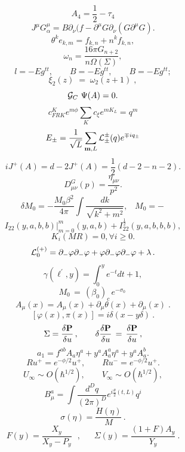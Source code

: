 \documentclass{article}
\begin{document}
$$A _ { 4 } = \frac { 1 } { 2 } - \tau _ { 4 }$$
$$J ^ { \mu } G _ { \alpha } ^ { \mu } = B \partial _ { \nu } ( f - \partial ^ { \mu } G \partial _ { \nu } ( G \partial ^ { \mu } G ) .$$
$$\theta ^ { k } e _ { k , m } = f _ { k , n } + n ^ { k } f _ { k , n } ,$$
$$\omega _ { n } = \frac { 1 6 \pi G _ { n + 2 } } { n \Omega ( \Sigma ) } ,$$
$$l = - E g ^ { t t } , \quad \quad B = - E g ^ { t t } , \quad \quad B = - E g ^ { t t } ;$$
$$\xi _ { 2 } ( z ) \; = \; \omega _ { 2 } ( z + 1 ) \; ,$$
$${ \cal G } _ { C } \ \Psi ( A ) = 0 .$$
$$c _ { F R K } ^ { K } e ^ { m \phi } \sum _ { K } c _ { \xi } e ^ { m K _ { L } } = q ^ { m }$$
$$E _ { \pm } = \frac { 1 } { \sqrt { L } } \sum _ { { \bf { m } } , L } { \cal L } _ { \pm } ^ { \pm } ( q ) e ^ { \mp i q _ { \pm } }$$
$$i J ^ { + } ( A ) = d - 2 J ^ { + } ( A ) = \frac { 1 } { 2 } \left ( d - 2 - n - 2 \right ) .$$
$$D _ { \mu \nu } ^ { G } ( p ) = \frac { \eta _ { \mu \nu } } { p ^ { 2 } } .$$
$$\delta M _ { 0 } = - \frac { M _ { 0 } \beta ^ { 2 } } { 4 \pi } \int \frac { d k } { \sqrt { k ^ { 2 } + m ^ { 2 } } } , \; \; \; M _ { 0 } = - \,$$
$$I _ { 2 2 } ( y , a , b , b ) | _ { m = 0 } ^ { m } ( y , a , b ) + I _ { 2 2 } ^ { \frac { 1 } { 2 } } ( y , a , b , b , b ) ,$$
$$K _ { i } ( M R ) = 0 , \forall i \geq 0 .$$
$${ \cal L } _ { 0 } ^ { ( + ) } = \partial _ { - } \varphi \partial _ { - } \varphi + \varphi \partial _ { - } \varphi \partial _ { - } \varphi + \lambda \, .$$
$$\gamma ( \ell ^ { \prime } , y ) = \int _ { 0 } ^ { y } e ^ { - t } d t + 1 ,$$
$$M _ { 0 } \, = \, \left ( \beta _ { 0 } \right ) _ { c } \, e ^ { - \sigma _ { 0 } } \,$$
$$A _ { \mu } ( x ) = A _ { \mu } ( x ) + \partial _ { \mu } \theta ( x ) + \partial _ { \mu } ( x ) \; .$$
$$[ \varphi ( x ) , \pi ( x ) ] = i \delta ( x - y \delta ) \ .$$
$$\Sigma = \frac { \delta { \bf P } } { \delta u } \, , \qquad \delta { \frac { \delta { \bf P } } { \delta u } } \, = \, { \frac { \delta { \bf P } } { \delta u } } \, ,$$
$$a _ { 1 } = f ^ { a b } A _ { a } \eta ^ { a } + y ^ { a } A _ { a } ^ { a } \eta ^ { a } + y ^ { a } A _ { a } ^ { b } .$$
$$R u ^ { + } = e ^ { - \phi / 2 } u ^ { + } , \qquad R u ^ { - } = e ^ { - \phi / 2 } u ^ { + } .$$
$$U _ { \infty } \sim O ( \hbar ^ { 1 / 2 } ) , \qquad V _ { \infty } \sim O ( \hbar ^ { 1 / 2 } ) ,$$
$$B _ { \mu } ^ { a } = \int \frac { d ^ { D } q } { ( 2 \pi ) ^ { D } } e ^ { i \frac { \theta } { 2 } ( t , L ) } q ^ { i }$$
$$\sigma ( \eta ) = \frac { H ( \eta ) } { M } \, .$$
$$F ( y ) = \frac { X _ { y } } { X _ { y } - P _ { y } } \ \ \ , \ \ \ \ \ \ \ \Sigma ( y ) = \frac { ( 1 + F ) A _ { y } } { Y _ { y } } \ .$$
\end{document}
